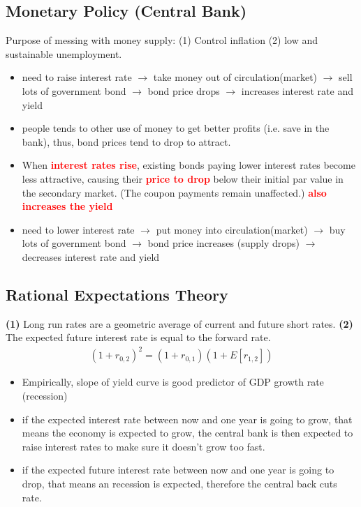 \begin{multicols}{2}
\vspace*{0.3cm}
\subsection{Monetary Policy (Central Bank)}
Purpose of messing with money supply: (1) Control inflation (2) low and sustainable unemployment. \par
{}
\begin{itemize}
    \item need to raise interest rate $\rightarrow$ take money out of circulation(market) $\rightarrow$ sell lots of government bond $\rightarrow$ bond price drops 
    $\rightarrow$ increases interest rate and yield 
    \item people tends to other use of money to get better profits (i.e. save in the bank), thus, bond prices tend to drop to attract.
    \item When \textcolor{red}{\textbf{interest rates rise}}, existing bonds paying lower interest rates become less attractive, causing their \textcolor{red}{\textbf{price to drop}} below their initial par value in the secondary market. (The coupon payments remain unaffected.) \textcolor{red}{\textbf{also increases the yield}}
\end{itemize}
\begin{itemize}
    \item need to lower interest rate $\rightarrow$ put money into circulation(market) $\rightarrow$ buy lots of government bond $\rightarrow$ bond price increases (supply drops) $\rightarrow$ decreases interest rate and yield 
\end{itemize}

\subsection{Rational Expectations Theory}
\textbf{(1)} Long run rates are a geometric average of current and future short rates. \textbf{(2)} The expected future interest rate is equal to the forward rate.
\begin{gather*}
    (1+r_{0,2})^2 = (1+r_{0,1})(1+E[r_{1,2}])
\end{gather*}
\begin{itemize}
    \item Empirically, slope of yield curve is good predictor of GDP growth rate (recession)
    \item if the expected interest rate between now and one year is going to grow, that means the economy is expected to grow, the central bank is then expected to raise interest rates to make sure it doesn't grow too fast.
    \item if the expected future interest rate between now and one year is going to drop, that means an recession is expected, therefore the central back cuts rate.  
\end{itemize}


\end{multicols}
